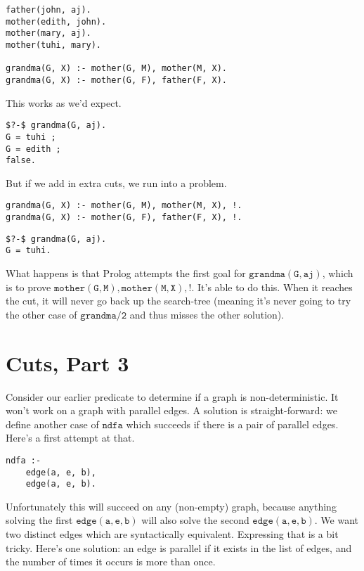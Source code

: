 \documentclass[a4paper,12pt]{article}
\newcommand{\kwa}[1]{\mathtt{#1}}
\begin{document}
\begin{lstlisting}
father(john, aj).
mother(edith, john).
mother(mary, aj).
mother(tuhi, mary).

grandma(G, X) :- mother(G, M), mother(M, X).
grandma(G, X) :- mother(G, F), father(F, X).
\end{lstlisting}

\noindent
This works as we'd expect.

\begin{lstlisting}
$?-$ grandma(G, aj).
G = tuhi ;
G = edith ;
false.
\end{lstlisting}

\noindent
But if we add in extra cuts, we run into a problem.

\begin{lstlisting}
grandma(G, X) :- mother(G, M), mother(M, X), !.
grandma(G, X) :- mother(G, F), father(F, X), !.
\end{lstlisting}

\begin{lstlisting}
$?-$ grandma(G, aj).
G = tuhi.
\end{lstlisting}

\noindent
What happens is that Prolog attempts the first goal for $\kwa{grandma(G, aj)}$, which is to prove $\kwa{mother(G, M), mother(M, X), !}$. It's able to do this. When it reaches the cut, it will never go back up the search-tree (meaning it's never going to try the other case of $\kwa{grandma \slash 2}$ and thus misses the other solution).

\section{Cuts, Part 3}

Consider our earlier predicate to determine if a graph is non-deterministic. It won't work on a graph with parallel edges. A solution is straight-forward: we define another case of $\kwa{ndfa}$ which succeeds if there is a pair of parallel edges. Here's a first attempt at that.

\begin{lstlisting}
ndfa :-
	edge(a, e, b),
	edge(a, e, b).
\end{lstlisting}

\noindent
Unfortunately this will succeed on any (non-empty) graph, because anything solving the first $\kwa{edge(a, e, b)}$ will also solve the second $\kwa{edge(a, e, b)}$. We want two distinct edges which are syntactically equivalent. Expressing that is a bit tricky. Here's one solution: an edge is parallel if it exists in the list of edges, and the number of times it occurs is more than once. \\
\end{document}
